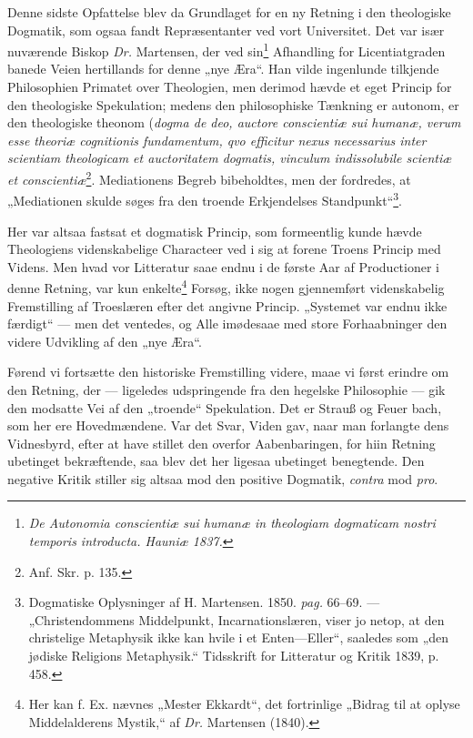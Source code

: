 \documentclass[12pt,a4paper]{book}
\newcommand{\opage}[1]{\marginnote{\footnotesize\textit{[#1]}}}
\begin{document}
Denne sidste Opfattelse blev da Grundlaget for en ny Retning i den
theologiske Dogmatik, som ogsaa fandt Repræsentanter ved vort Universitet.
Det var især nuværende Biskop
\opage{16}\setcounter{footnote}{0}%
\textit{Dr.} Martensen, der ved sin\footnote{\textit{De Autonomia
conscientiæ sui humanæ in theologiam dogmaticam nostri temporis introducta.
Hauniæ 1837.}} Afhandling for Licentiatgraden banede Veien hertillands for
denne „nye Æra“. Han vilde ingenlunde tilkjende Philosophien Primatet over
Theologien, men derimod hævde et eget Princip for den theologiske
Spekulation; medens den philosophiske Tænkning er autonom, er den
theologiske theonom (\textit{dogma de deo, auctore conscientiæ sui humanæ,
verum esse theoriæ cognitionis fundamentum, qvo efficitur nexus necessarius
inter scientiam theologicam et auctoritatem dogmatis, vinculum indissolubile
scientiæ et conscientiæ}\footnote{Anf. Skr. p. 135.}.
Mediationens Begreb bibeholdtes, men der fordredes, at „Mediationen skulde
søges fra den troende Erkjendelses Standpunkt“\footnote{Dogmatiske
Oplysninger af H. Martensen. 1850. \textit{pag.} 66--69. --- „Christendommens
Middelpunkt, Incarnationslæren, viser jo netop, at den christelige
Metaphysik ikke kan hvile i et Enten---Eller“, saaledes som „den jødiske
Religions Metaphysik.“ Tidsskrift for Litteratur og Kritik 1839, p.
458.}.

Her var altsaa fastsat et dogmatisk Princip, som formeentlig kunde hævde
Theologiens videnskabelige Characteer ved i sig at forene Troens Princip med
Videns. Men hvad vor Litteratur saae endnu i de første Aar af Productioner i
denne Retning, var kun enkelte\footnote{Her kan f. Ex. nævnes „Mester
Ekkardt“, det fortrinlige „Bidrag til at oplyse Middelalderens Mystik,“ af
\textit{Dr.} Martensen (1840).} Forsøg, ikke nogen gjennemført videnskabelig
Fremstilling af Troeslæren efter det angivne Princip. „Systemet var endnu
ikke færdigt“ --- men det ventedes, og Alle imødesaae med store
Forhaabninger den videre Udvikling af den „nye Æra“.

Førend vi fortsætte den historiske Fremstilling videre, maae vi først
erindre om den Retning, der --- ligeledes udspringende fra den hegelske
Philosophie --- gik den modsatte Vei af den „troende“ Spekulation. Det er
Strauß og Feuer%
\opage{17}\setcounter{footnote}{0}%
bach, som her ere Hovedmændene. Var det Svar, Viden gav, naar man forlangte
dens Vidnesbyrd, efter at have stillet den overfor Aabenbaringen, for hiin
Retning ubetinget bekræftende, saa blev det her ligesaa ubetinget
benegtende. Den negative Kritik stiller sig altsaa mod den positive
Dogmatik, \textit{contra} mod \textit{pro}.
\end{document}
